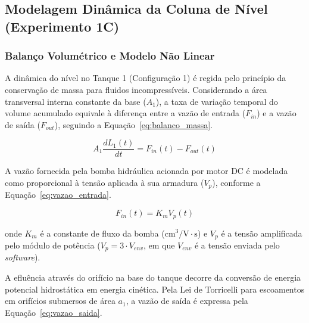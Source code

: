 \documentclass[a4paper,12pt]{article}
\begin{document}
\subsection{Modelagem Dinâmica da Coluna de Nível (Experimento 1C)}

\subsubsection{Balanço Volumétrico e Modelo Não Linear}

\begin{justify}
    \hspace{4ex}A dinâmica do nível no Tanque 1 (Configuração 1) é regida pelo princípio da conservação de massa para fluidos incompressíveis. Considerando a área transversal interna constante da base ($A_1$), a taxa de variação temporal do volume acumulado equivale à diferença entre a vazão de entrada ($F_{in}$) e a vazão de saída ($F_{out}$), seguindo a Equação~\eqref{eq:balanco_massa}.
\end{justify}

\begin{equation}
    A_1 \frac{dL_1(t)}{dt} = F_{in}(t) - F_{out}(t)
    \label{eq:balanco_massa}
\end{equation}

\begin{justify}
    \hspace{4ex}A vazão fornecida pela bomba hidráulica acionada por motor DC é modelada como proporcional à tensão aplicada à sua armadura ($V_p$), conforme a Equação~\eqref{eq:vazao_entrada}.
\end{justify}

\begin{equation}
    F_{in}(t) = K_m V_p(t)
    \label{eq:vazao_entrada}
\end{equation}

\noindent onde $K_m$ é a constante de fluxo da bomba ($\text{cm}^3/\text{V}\cdot\text{s}$) e $V_p$ é a tensão amplificada pelo módulo de potência ($V_p = 3 \cdot V_{env}$, em que $V_{env}$ é a tensão enviada pelo \textit{software}).

\begin{justify}
    \hspace{4ex}A efluência através do orifício na base do tanque decorre da conversão de energia potencial hidrostática em energia cinética. Pela Lei de Torricelli para escoamentos em orifícios submersos de área $a_1$, a vazão de saída é expressa pela Equação~\eqref{eq:vazao_saida}.
\end{justify}
\end{document}
